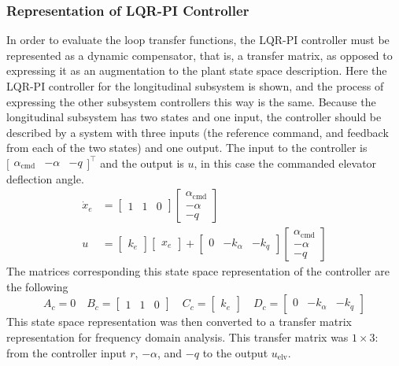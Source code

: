 \subsubsection*{Representation of LQR-PI Controller}

In order to evaluate the loop transfer functions, the LQR-PI controller must be represented as a dynamic compensator, that is, a transfer matrix, as opposed to expressing it as an augmentation to the plant state space description.
Here the LQR-PI controller for the longitudinal subsystem is shown, and the process of expressing the other subsystem controllers this way is the same.
Because the longitudinal subsystem has two states and one input, the controller should be described by a system with three inputs (the reference command, and feedback from each of the two states) and one output.
The input to the controller is $\bigr[\begin{array}{ccc} \alpha_{\text{cmd}} & -\alpha & -q \end{array}\bigr]^{\top}$ and the output is $u$, in this case the commanded elevator deflection angle.
\begin{align}
  \dot{x}_{e}&=
  \begin{bmatrix}
    1 & 1 & 0
  \end{bmatrix}
  \begin{bmatrix}
    \alpha_{\text{cmd}} \\
    -\alpha \\
    -q
  \end{bmatrix} \\
  u&=
  \begin{bmatrix}
    k_{e}
  \end{bmatrix}
  \begin{bmatrix}
    x_{e}
  \end{bmatrix}+
  \begin{bmatrix}
    0 & -k_{\alpha} & -k_{q}
  \end{bmatrix}
  \begin{bmatrix}
    \alpha_{\text{cmd}} \\
    -\alpha \\
    -q
  \end{bmatrix}
\end{align}
The matrices corresponding this state space representation of the controller are the following
\begin{equation}
  A_{c}=0 \quad B_{c}=
  \begin{bmatrix}
    1 & 1 & 0
  \end{bmatrix}
  \quad C_{c}=
  \begin{bmatrix}
    k_{e}
  \end{bmatrix}
  \quad D_{c}=
  \begin{bmatrix}
    0 & -k_{\alpha} & -k_{q}
  \end{bmatrix}
\end{equation}
This state space representation was then converted to a transfer matrix representation for frequency domain analysis.
This transfer matrix was $1\times3$: from the controller input $r$, $-\alpha$, and $-q$ to the output $u_{\text{elv}}$.

